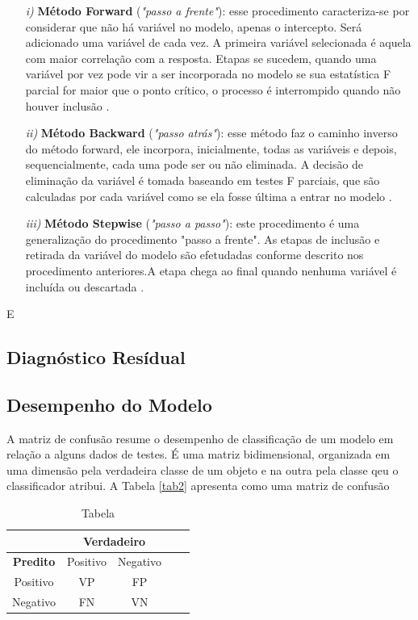 \documentclass[
	12pt,				%
	openright,			%
	oneside,      %
	a4paper,			%
	english,			%
	french,				%
	spanish,			%
	brazil,				%
	]{abntex2}\usepackage[]{graphicx}\usepackage[table]{xcolor}
\theoremstyle{definition}
\begin{document}
\begin{itemize}
  \item[\textit{i)}] \textbf{Método Forward} (\textit{"passo a frente"}): esse procedimento caracteriza-se por considerar que não há variável no modelo, apenas o intercepto. Será adicionado uma variável de cada vez. A primeira variável selecionada é aquela com maior correlação com a resposta. Etapas se sucedem, quando uma variável por vez pode vir a ser incorporada no modelo se sua estatística F parcial for maior que o ponto crítico, o processo é interrompido quando não houver inclusão \cite{charnet2008analise}.
  \item[\textit{ii)}] \textbf{Método Backward} (\textit{"passo atrás"}): esse método faz o caminho inverso do método forward, ele incorpora, inicialmente, todas as variáveis e depois, sequencialmente, cada uma pode ser ou não eliminada. A decisão de eliminação da variável é tomada baseando em testes F parciais, que são calculadas por cada variável como se ela fosse última a entrar no modelo \cite{charnet2008analise}.
  \item[\textit{iii)}] \textbf{Método Stepwise} (\textit{"passo a passo"}): este procedimento é uma generalização do procedimento "passo a frente". As etapas de inclusão e retirada da variável do modelo são efetudadas conforme descrito nos procedimento anteriores.A etapa chega ao final quando nenhuma variável é incluída ou descartada \cite{charnet2008analise}.
\end{itemize}

E
      

       
       
       \subsection{Diagnóstico Resídual}
       
       
       \subsection{Desempenho do Modelo}
       
A matriz de confusão resume o desempenho de classificação de um modelo em relação a alguns dados de testes. É uma matriz bidimensional, organizada em uma dimensão pela verdadeira classe de um objeto e na outra pela classe qeu o classificador atribui. A Tabela \ref{tab2} apresenta como uma matriz de confusão 


\begin{table}[]
\caption{Tabela}
\label{tab:my-table}
\begin{tabular}{|c|cc|l|l|}
\hline
 & \multicolumn{2}{c|}{Verdadeiro}      \\ \hline
 \textbf{Predito}& \multicolumn{1}{c|}{Positivo} & Negativo  \\ \hline
 Positivo& \multicolumn{1}{c|}{VP} &  FP  \\ \hline
 Negativo& \multicolumn{1}{c|}{FN} &  VN  \\ \hline
\end{tabular}
\end{table}
\end{document}
